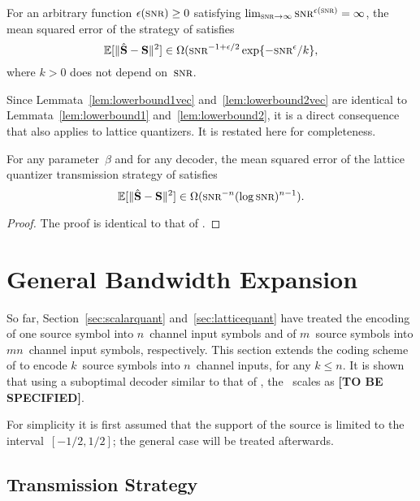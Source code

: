 \begin{lemma}
  \label{lem:lowerbound2vec}
  For an arbitrary function $\e(\snr) \ge 0$ satisfying $\limtoinf{\snr}
  \snr^{\e(\snr)} = \infty$, the mean squared error of the strategy of
   satisfies
  \begin{equation*}
    \msev \in \Omega(\snr^{-1 + \e/2} \exp\{- \snr^\e/k \},
  \end{equation*}
  where $k > 0$ does not depend on~$\snr$.
\end{lemma}

Since Lemmata~\ref{lem:lowerbound1vec} and~\ref{lem:lowerbound2vec} are
identical to Lemmata~\ref{lem:lowerbound1} and~\ref{lem:lowerbound2}, it is a
direct consequence that  also applies to lattice quantizers.
It is restated here for completeness.

\begin{theorem}
  \label{thm:scalinglbvec}
  For any parameter~$\beta$ and for any decoder, the mean squared error of the
  lattice quantizer transmission strategy of  satisfies
  \begin{equation*}
    \msev \in \Omega(\snr^{-n} (\log\snr)^{n-1}).
  \end{equation*}
\end{theorem}

\begin{proof}
  The proof is identical to that of .
\end{proof}


\section{General Bandwidth Expansion}\label{sec:genbwexp}

So far, Section~\ref{sec:scalarquant} and~\ref{sec:latticequant} have treated
the encoding of one source symbol into $n$~channel input symbols and of
$m$~source symbols into $mn$~channel input symbols, respectively. This section
extends the coding scheme of  to encode $k$~source symbols
into $n$~channel inputs, for any $k \le n$. It is shown that using a suboptimal
decoder similar to that of , the \sdr\ scales as
\textbf{[TO BE SPECIFIED]}.

For simplicity it is first assumed that the support of the source is limited to
the interval~$[-1/2, 1/2]$; the general case will be treated afterwards. 


\subsection{Transmission Strategy}

